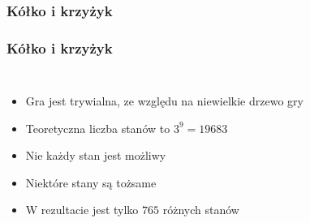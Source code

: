 \documentclass[polish,envcountsect,10pt]{beamer}
\begin{document}
            \subsubsection{Kółko i krzyżyk}
                \begin{frame}
                    \frametitle{Kółko i krzyżyk}
                    \begin{columns}
                            \begin{itemize}
                                \item<1-> Gra jest trywialna, ze względu na niewielkie drzewo gry
                                \item<2-> Teoretyczna liczba stanów to $3^9 = 19683$
                                \item<3-> Nie każdy stan jest możliwy
                                \item<4-> Niektóre stany są tożsame
                                \item<7-> W rezultacie jest tylko $765$ różnych stanów \cite{tictactoe}
                            \end{itemize}
\end{columns}
\end{frame}
\end{document}
